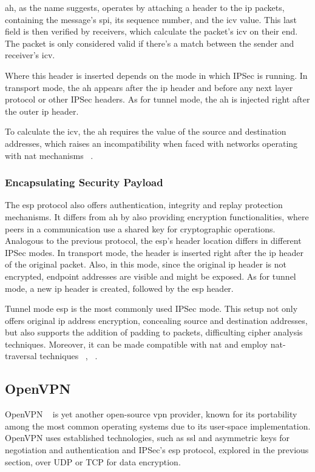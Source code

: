 \documentclass[11pt,twoside,a4paper]{report}
\begin{document}
\ac{ah}, as the name suggests, operates by attaching a header to the \ac{ip} packets, containing the message's \ac{spi}, its sequence number, and the \ac{icv} value. This last field is then verified by receivers, which calculate the packet's \ac{icv} on their end. The packet is only considered valid if there's a match between the sender and receiver's \ac{icv}.

Where this header is inserted depends on the mode in which IPSec is running. In transport mode, the \ac{ah} appears after the \ac{ip} header and before any next layer protocol or other IPSec headers. As for tunnel mode, the \ac{ah} is injected right after the outer \ac{ip} header.

To calculate the \ac{icv}, the \ac{ah} requires the value of the source and destination addresses, which raises an incompatibility when faced with networks operating with \ac{nat} mechanisms ~\cite{frankel2005guide}.

\subsubsection{Encapsulating Security Payload}

The \ac{esp} protocol also offers authentication, integrity and replay protection mechanisms. It differs from \ac{ah} by also providing encryption functionalities, where peers in a communication use a shared key for cryptographic operations. Analogous to the previous protocol, the \ac{esp}'s header location differs in different IPSec modes. In transport mode, the header is inserted right after the \ac{ip} header of the original packet. Also, in this mode, since the original \ac{ip} header is not encrypted, endpoint addresses are visible and might be exposed. As for tunnel mode, a new \ac{ip} header is created, followed by the \ac{esp} header.

Tunnel mode \ac{esp} is the most commonly used IPSec mode. This setup not only offers original \ac{ip} address encryption, concealing source and destination addresses, but also supports the addition of padding to packets, difficulting cipher analysis techniques. Moreover, it can be made compatible with \ac{nat} and employ \ac{nat}-traversal techniques ~\cite{nam2022high}, ~\cite{singh2012nat}.

\subsection{OpenVPN}

OpenVPN ~\cite{ovpnwebsite} is yet another open-source \ac{vpn} provider, known for its portability among the most common operating systems due to its user-space implementation. OpenVPN uses established technologies, such as \ac{ssl} and asymmetric keys for negotiation and authentication and IPSec's \ac{esp} protocol, explored in the previous section, over UDP or TCP for data encryption.
\end{document}

